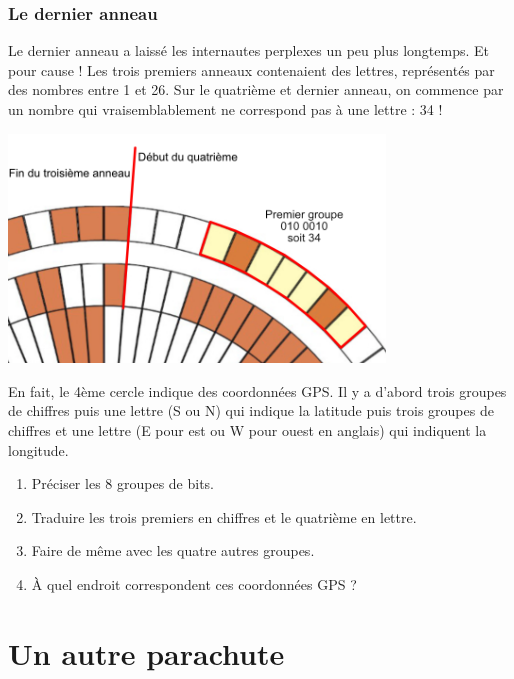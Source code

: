 \documentclass[a4paper,dvipsnames]{article}
\begin{document}
\subsubsection{Le dernier anneau}

Le dernier anneau a laissé les internautes perplexes un peu plus longtemps. Et pour cause ! Les trois premiers anneaux contenaient des lettres, représentés par des nombres entre 1 et 26. Sur le quatrième et dernier anneau, on commence par un nombre qui vraisemblablement ne correspond pas à une lettre : 34 !

\begin{center}
  \includegraphics[width=10cm]{img/cercle-externe.png}
\end{center}

En fait, le 4ème cercle indique des coordonnées GPS. Il y a d'abord trois groupes de chiffres puis une lettre (S ou N) qui indique la latitude puis trois groupes de chiffres et une lettre (E pour est ou W pour ouest en anglais) qui indiquent la longitude.

\medskip

\begin{exercice}{}{}
  \begin{enumerate}
    \item Préciser les 8 groupes de bits.
    \item Traduire les trois premiers en chiffres et le quatrième en lettre.
    \item Faire de même avec les quatre autres groupes.
    \item À quel endroit correspondent ces coordonnées GPS ?
  \end{enumerate}
\end{exercice}

\pagebreak

\section{Un autre parachute}
\end{document}
